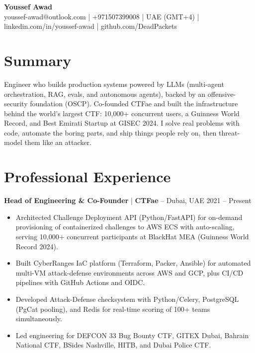 \documentclass[10pt,a4paper]{article}
\begin{document}
\begin{center}
    {\Large \textbf{Youssef Awad}}\\[2pt]
    {\small youssef-awad@outlook.com | +971507399008 | UAE (GMT+4) | linkedin.com/in/youssef-awad | github.com/DeadPackets}
\end{center}

\section{Summary}
{\small Engineer who builds production systems powered by LLMs (multi-agent orchestration, RAG, evals, and autonomous agents), backed by an offensive-security foundation (OSCP). Co-founded CTFae and built the infrastructure behind the world's largest CTF: 10,000+ concurrent users, a Guinness World Record, and Best Emirati Startup at GISEC 2024. I solve real problems with code, automate the boring parts, and ship things people rely on, then threat-model them like an attacker.}

\section{Professional Experience}

{\small\textbf{Head of Engineering \& Co-Founder} | \textbf{CTFae} -- Dubai, UAE \hfill 2021 -- Present}
\begin{itemize}
    \item {\small Architected Challenge Deployment API (Python/FastAPI) for on-demand provisioning of containerized challenges to AWS ECS with auto-scaling, serving 10,000+ concurrent participants at BlackHat MEA (Guinness World Record 2024).}
    \item {\small Built CyberRanges IaC platform (Terraform, Packer, Ansible) for automated multi-VM attack-defense environments across AWS and GCP, plus CI/CD pipelines with GitHub Actions and OIDC.}
    \item {\small Developed Attack-Defense checksystem with Python/Celery, PostgreSQL (PgCat pooling), and Redis for real-time scoring of 100+ teams simultaneously.}
    \item {\small Led engineering for DEFCON 33 Bug Bounty CTF, GITEX Dubai, Bahrain National CTF, BSides Nashville, HITB, and Dubai Police CTF.}
\end{itemize}

\vspace{2pt}
\end{document}
